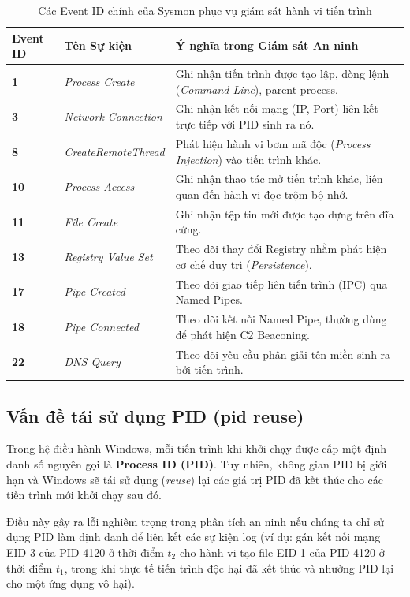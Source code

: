 ﻿\documentclass[../main.tex]{subfiles}
\begin{document}
\begin{table}[H]
\centering
\small
\setlength{\tabcolsep}{4pt}
\caption{Các Event ID chính của Sysmon phục vụ giám sát hành vi tiến trình}
\label{tab:sysmon_eids}
\begin{tabular}{|>{\centering\arraybackslash}p{1.8cm}|p{3.2cm}|p{8.0cm}|}
\hline
\textbf{Event ID} & \textbf{Tên Sự kiện} & \textbf{Ý nghĩa trong Giám sát An ninh} \\ \hline
\textbf{1} & \textit{Process Create} & Ghi nhận tiến trình được tạo lập, dòng lệnh (\textit{Command Line}), parent process. \\ \hline
\textbf{3} & \textit{Network Connection} & Ghi nhận kết nối mạng (IP, Port) liên kết trực tiếp với PID sinh ra nó. \\ \hline
\textbf{8} & \textit{CreateRemoteThread} & Phát hiện hành vi bơm mã độc (\textit{Process Injection}) vào tiến trình khác. \\ \hline
\textbf{10} & \textit{Process Access} & Ghi nhận thao tác mở tiến trình khác, liên quan đến hành vi đọc trộm bộ nhớ. \\ \hline
\textbf{11} & \textit{File Create} & Ghi nhận tệp tin mới được tạo dựng trên đĩa cứng. \\ \hline
\textbf{13} & \textit{Registry Value Set} & Theo dõi thay đổi Registry nhằm phát hiện cơ chế duy trì (\textit{Persistence}). \\ \hline
\textbf{17} & \textit{Pipe Created} & Theo dõi giao tiếp liên tiến trình (IPC) qua Named Pipes. \\ \hline
\textbf{18} & \textit{Pipe Connected} & Theo dõi kết nối Named Pipe, thường dùng để phát hiện C2 Beaconing. \\ \hline
\textbf{22} & \textit{DNS Query} & Theo dõi yêu cầu phân giải tên miền sinh ra bởi tiến trình. \\ \hline
\end{tabular}
\end{table}

\subsection{Vấn đề tái sử dụng PID (pid reuse)}
\label{subsection:1.1.1}
Trong hệ điều hành Windows, mỗi tiến trình khi khởi chạy được cấp một định danh số nguyên gọi là \textbf{Process ID (PID)}. Tuy nhiên, không gian PID bị giới hạn và Windows sẽ tái sử dụng (\textit{reuse}) lại các giá trị PID đã kết thúc cho các tiến trình mới khởi chạy sau đó. 

Điều này gây ra lỗi nghiêm trọng trong phân tích an ninh nếu chúng ta chỉ sử dụng PID làm định danh để liên kết các sự kiện log (ví dụ: gán kết nối mạng EID 3 của PID 4120 ở thời điểm $t_2$ cho hành vi tạo file EID 1 của PID 4120 ở thời điểm $t_1$, trong khi thực tế tiến trình độc hại đã kết thúc và nhường PID lại cho một ứng dụng vô hại).
\end{document}

